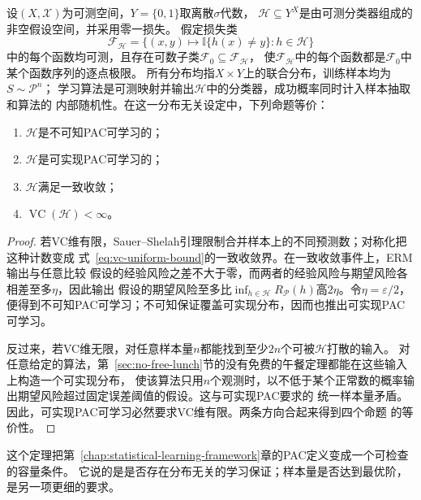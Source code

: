 \begin{theorem}[二分类学习基本定理]
\label{thm:binary-fundamental-theorem}
设$(X,\mathcal X)$为可测空间，$Y=\{0,1\}$取离散$\sigma$代数，
$\mathcal H\subseteq Y^X$是由可测分类器组成的非空假设空间，并采用零一损失。
假定损失类
\[
 \mathcal F_{\mathcal H}
 =\{(x,y)\mapsto\mathbb I\{h(x)\neq y\}:h\in\mathcal H\}
\]
中的每个函数均可测，且存在可数子类$\mathcal F_0\subseteq\mathcal F_{\mathcal H}$，
使$\mathcal F_{\mathcal H}$中的每个函数都是$\mathcal F_0$中某个函数序列的逐点极限。
所有分布均指$X\times Y$上的联合分布，训练样本均为$S\sim\mathcal P^n$；
学习算法是可测映射并输出$\mathcal H$中的分类器，成功概率同时计入样本抽取和算法的
内部随机性。在这一分布无关设定中，下列命题等价：
\begin{enumerate}
 \item $\mathcal H$是不可知PAC可学习的；
 \item $\mathcal H$是可实现PAC可学习的；
 \item $\mathcal H$满足一致收敛；
 \item $\operatorname{VC}(\mathcal H)<\infty$。
\end{enumerate}
\end{theorem}
\begin{proof}
若VC维有限，Sauer--Shelah引理限制合并样本上的不同预测数；对称化把这种计数变成
式~\eqref{eq:vc-uniform-bound}的一致收敛界。在一致收敛事件上，ERM输出与任意比较
假设的经验风险之差不大于零，而两者的经验风险与期望风险各相差至多$\eta$，因此输出
假设的期望风险至多比$\inf_{h\in\mathcal H}R_{\mathcal P}(h)$高$2\eta$。令$\eta=\varepsilon/2$，
便得到不可知PAC可学习；不可知保证覆盖可实现分布，因而也推出可实现PAC可学习。

反过来，若VC维无限，对任意样本量$n$都能找到至少$2n$个可被$\mathcal H$打散的输入。
对任意给定的算法，第~\ref{sec:no-free-lunch}节的没有免费的午餐定理都能在这些输入上构造一个可实现分布，
使该算法只用$n$个观测时，以不低于某个正常数的概率输出期望风险超过固定误差阈值的假设。这与可实现PAC要求的
统一样本量矛盾。因此，可实现PAC可学习必然要求VC维有限。两条方向合起来得到四个命题
的等价性。
\end{proof}

这个定理把第~\ref{chap:statistical-learning-framework}章的PAC定义变成一个可检查的容量条件。
它说的是是否存在分布无关的学习保证；样本量是否达到最优阶，是另一项更细的要求。


